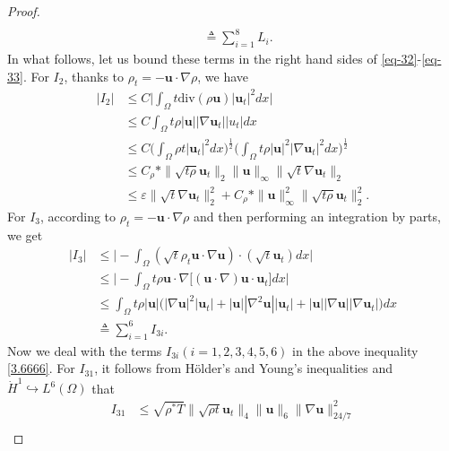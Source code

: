 \documentclass[11pt]{article}
\numberwithin{equation}{section}
\begin{document}
\begin{proof}
\begin{equation}
\begin{split}
\\&\triangleq\sum_{i=1}^{8} L_i.
\end{split}
\end{equation}
In what follows, let us bound these terms in the right hand sides of  \eqref{eq-32}-\eqref{eq-33}.  For \( I_2 \), thanks to \( \rho_t = - \mathbf{u} \cdot \nabla \rho \), we have
\begin{equation}
\begin{split}
|I_2 |&\leq C \big| \int_{\Omega} t \mathrm{div}(\rho \mathbf{u}) |\mathbf{u}_t|^2 dx \big|\\
&\leq C \int_{\Omega} t \rho |\mathbf{u}| |\nabla \mathbf{u}_t| |u_t| dx  \\
&\leq C\big( \int_{\Omega} \rho t |\mathbf{u}_t|^2 dx \big)^{\frac{1}{2}} \big( \int_{\Omega} t \rho |\mathbf{u}|^2 |\nabla \mathbf{u}_t|^2 dx \big)^{\frac{1}{2}} \\
&\leq C_\rho*  \| \sqrt{t \rho} \mathbf{u}_t \|_2 \| \mathbf{u} \|_{\infty} \| \sqrt{t} \nabla \mathbf{u}_t \|_2  \\
&\leq \varepsilon \| \sqrt{t} \nabla \mathbf{u}_t \|_2^2 + C_\rho*   \| \mathbf{u} \|_{\infty}^2\| \sqrt{t \rho} \mathbf{u}_t \|_2^2.
\end{split}
\end{equation}
For \( I_3 \), according to \( \rho_t = - \mathbf{u} \cdot \nabla \rho \) and then performing an integration by parts, we get
\begin{equation}\label{3.6666}
\begin{split}
|I_3 |&\leq \big| - \int_{\Omega} (\sqrt{t} \rho_t \mathbf{u} \cdot \nabla \mathbf{u}) \cdot (\sqrt{t} \mathbf{u}_t) dx \big|\\
&\leq \big| - \int_{\Omega} t \rho \mathbf{u} \cdot \nabla \big[ (\mathbf{u} \cdot \nabla) \mathbf{u} \cdot \mathbf{u}_t \big] dx \big| \\
&\leq \int_{\Omega} t \rho |\mathbf{u}| \big( |\nabla \mathbf{u}|^2 |\mathbf{u}_t| + |\mathbf{u}| |\nabla^2 \mathbf{u}| |\mathbf{u}_t| + |\mathbf{u}| |\nabla \mathbf{u}| |\nabla \mathbf{u}_t|)dx  \\
&\triangleq \sum_{i=1}^6 I_{3i}.
\end{split}
\end{equation}
Now we deal with the terms $I_{3i}$$(i=1,2,3,4,5,6)$ in the above inequality \eqref{3.6666}.  For $I_{31}$, it follows from H\"{o}lder's and Young's inequalities and $\dot{H}^1\hookrightarrow L^6(\Omega)$ that
\begin{align*}
I_{31} &\leq \sqrt{\rho^* T} \| \sqrt{\rho t} \mathbf{u}_t \|_4 \| \mathbf{u} \|_6 \| \nabla \mathbf{u} \|_{24/7}^2 \\

\end{align*}$$
\end{proof}
\end{document}
